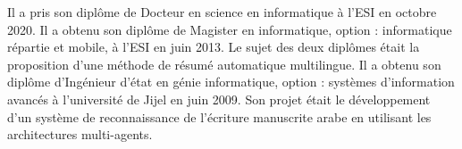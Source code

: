 \documentclass{KBook}
\begin{document}
\begin{tcolorbox}[colback=my-grey,
	colframe=my-grey,  
	center, arc=0pt,outer arc=0pt,
	valign=top, 
	halign=flush left,
	width=\textwidth]
\begin{minipage}[t]{0.80\textwidth}
		Il a pris son diplôme de Docteur en science en informatique à l'ESI en octobre 2020.
		Il a obtenu son diplôme de Magister en informatique, option : informatique répartie et mobile, à l'ESI en juin 2013.
		Le sujet des deux diplômes était la proposition d'une méthode de résumé automatique multilingue.
		Il a obtenu son diplôme d'Ingénieur d'état en génie informatique, option : systèmes d'information avancés à l'université de Jijel en juin 2009.
		Son projet était le développement d'un système de reconnaissance de l'écriture manuscrite arabe en utilisant les architectures multi-agents.
		
	\end{minipage}
	
	
\end{tcolorbox}
\end{document}
